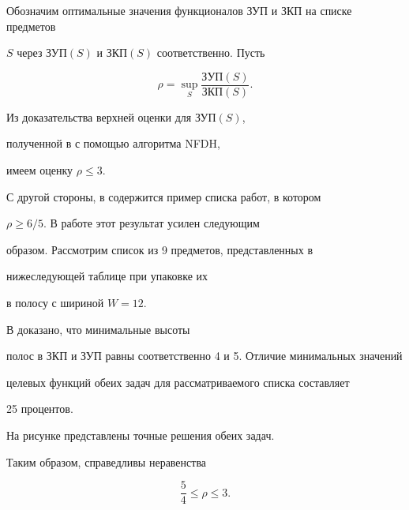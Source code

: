 Обозначим оптимальные значения функционалов ЗУП и ЗКП на списке предметов


$S$ через ЗУП$(S)$ и ЗКП$(S)$ соответственно. Пусть


$$


\rho = \sup_{S} \frac {ЗУП(S)}{ЗКП(S)}.


$$







Из доказательства верхней оценки для ЗУП$(S)$, 


полученной в \cite{CGJT} с помощью алгоритма NFDH,


имеем оценку $\rho \le 3$.





С другой стороны, в \cite{G} содержится пример списка работ, в котором


$\rho \ge 6/5$. В работе \cite{SH} этот результат усилен следующим


образом. Рассмотрим список из 9 предметов, представленных в 


нижеследующей таблице при упаковке их


в полосу с шириной $W=12$.


В \cite{SH} доказано, что минимальные высоты


полос в ЗКП и ЗУП равны соответственно 4 и 5. Отличие минимальных значений 


целевых функций обеих задач для рассматриваемого списка составляет 


25 процентов. 


На рисунке представлены точные решения обеих задач.





Таким образом, справедливы неравенства


$$


\frac {5}{4} \le \rho \le 3.


$$


\medskip







